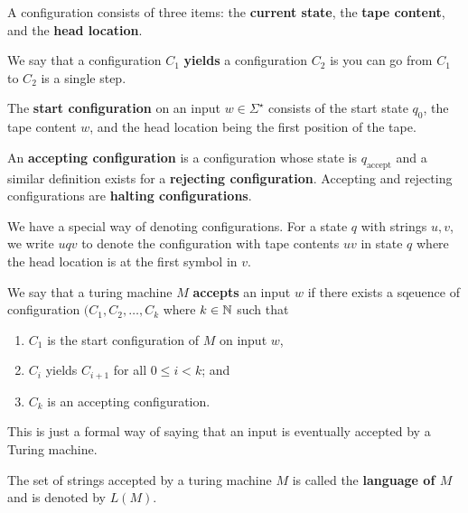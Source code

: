 \begin{definition}[Configuration]
    A configuration consists of three items: the \textbf{current state}, the \textbf{tape content}, and the \textbf{head location}. 
\end{definition}

We say that a configuration $C_1$ \textbf{yields} a configuration $C_2$ is you can go from $C_1$ to $C_2$ is a single step.

The \textbf{start configuration} on an input $w \in \Sigma^{\star}$ consists of the start state $q_0$, the tape content $w$, and the head location being the first position of the tape.

An \textbf{accepting configuration} is a configuration whose state is $q_{\text{accept}}$ and a similar definition exists for a \textbf{rejecting configuration}. Accepting and rejecting configurations are \textbf{halting configurations}.

We have a special way of denoting configurations. For a state $q$ with strings $u, v$, we write $uqv$ to denote the configuration with tape contents $uv$ in state $q$ where the head location is at the first symbol in $v$.

\begin{definition}
    We say that a turing machine $M$ \textbf{accepts} an input $w$ if there exists a sqeuence of configuration $(C_1, C_2, \ldots, C_k$ where $k \in \mathbb{N}$ such that
    \begin{enumerate}
        \item $C_1$ is the start configuration of $M$ on input $w$,
        \item $C_i$ yields $C_{i+1}$ for all $0 \leq i < k$; and
        \item $C_k$ is an accepting configuration.
    \end{enumerate}
\end{definition}

This is just a formal way of saying that an input is eventually accepted by a Turing machine.

\begin{definition}
    The set of strings accepted by a turing machine $M$ is called the \textbf{language of $M$} and is denoted by $L(M)$.
\end{definition}

